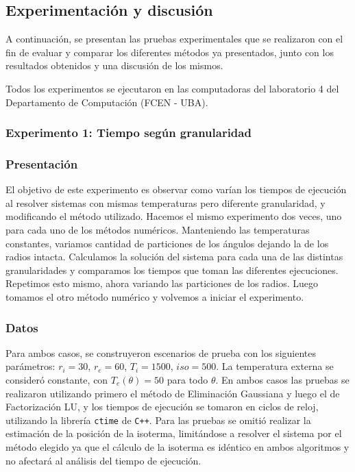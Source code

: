  \subsection{Experimentación y discusión}

    A continuación, se presentan las pruebas experimentales que se realizaron con el fin de evaluar y comparar los diferentes métodos ya presentados, junto con los resultados obtenidos y una discusión de los mismos.

    Todos los experimentos se ejecutaron en las computadoras del laboratorio 4 del Departamento de Computación (FCEN - UBA). 

    \subsubsection*{Experimento 1: Tiempo según granularidad} 

      \subsubsection*{Presentación}
        El objetivo de este experimento es observar como varían los tiempos de ejecución al resolver sistemas con mismas temperaturas pero diferente granularidad, y modificando el método utilizado. 
        Hacemos el mismo experimento dos veces, uno para cada uno de los métodos numéricos. Manteniendo las temperaturas constantes, variamos cantidad de particiones de los ángulos dejando la de los radios intacta. Calculamos la solución del sistema para cada una de las distintas granularidades y comparamos los tiempos que toman las diferentes ejecuciones. Repetimos esto mismo, ahora variando las particiones de los radios. Luego tomamos el otro método numérico y volvemos a iniciar el experimento. 

      \subsubsection*{Datos}
        Para ambos casos, se construyeron escenarios de prueba con los siguientes parámetros: $r_i = 30$, $r_e = 60$, $T_i = 1500$, $iso = 500$. La temperatura externa se consideró constante, con $T_e(\theta) = 50$ para todo $\theta$. En ambos casos las pruebas se realizaron utilizando primero el método de Eliminación Gaussiana y luego el de Factorización LU, y los tiempos de ejecución se tomaron en ciclos de reloj, utilizando la librería \texttt{ctime} de \texttt{C++}. Para las pruebas se omitió realizar la estimación de la posición de la isoterma, limitándose a resolver el sistema por el método elegido ya que el cálculo de la isoterma es idéntico en ambos algoritmos y no afectará al análisis del tiempo de ejecución. 
      
